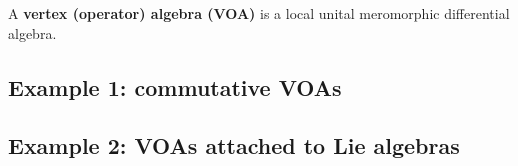         \begin{definition}[VOAs] \label{def: VOAs}
            A \textbf{vertex (operator) algebra (VOA)} is a local unital meromorphic differential algebra.
        \end{definition}

    \subsection{Example 1: commutative VOAs}

    \subsection{Example 2: VOAs attached to Lie algebras}